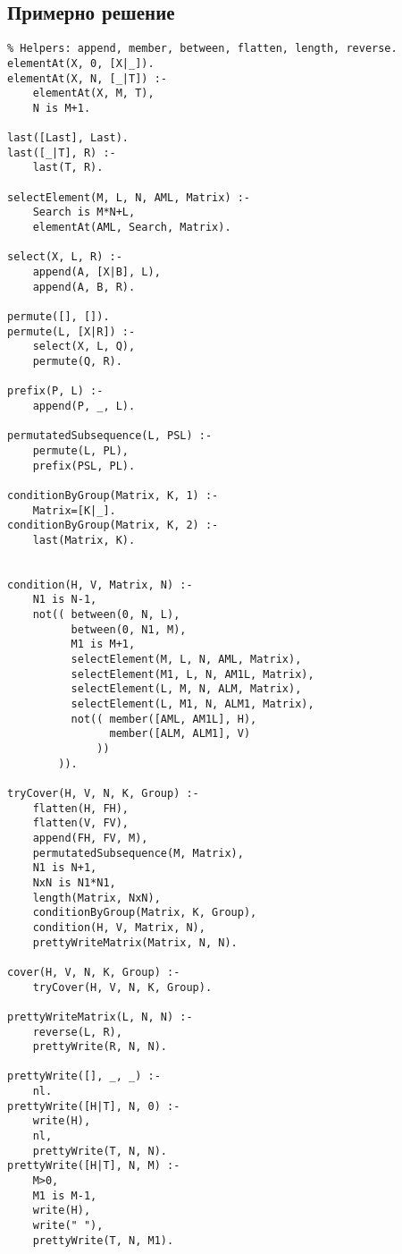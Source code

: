 \documentclass[12pt]{article}
\newenvironment{longlisting}{\captionsetup{type=listing}}{}
\begin{document}
\subsection{Примерно решение}
\begin{longlisting}
\begin{verbatim}
% Helpers: append, member, between, flatten, length, reverse.
elementAt(X, 0, [X|_]).
elementAt(X, N, [_|T]) :-
    elementAt(X, M, T),
    N is M+1.

last([Last], Last).
last([_|T], R) :-
    last(T, R).

selectElement(M, L, N, AML, Matrix) :-
    Search is M*N+L,
    elementAt(AML, Search, Matrix).

select(X, L, R) :-
    append(A, [X|B], L),
    append(A, B, R).

permute([], []).
permute(L, [X|R]) :-
    select(X, L, Q),
    permute(Q, R).

prefix(P, L) :-
    append(P, _, L).

permutatedSubsequence(L, PSL) :-
    permute(L, PL),
    prefix(PSL, PL).

conditionByGroup(Matrix, K, 1) :-
    Matrix=[K|_].
conditionByGroup(Matrix, K, 2) :-
    last(Matrix, K).


condition(H, V, Matrix, N) :-
    N1 is N-1,
    not(( between(0, N, L),
          between(0, N1, M),
          M1 is M+1,
          selectElement(M, L, N, AML, Matrix),
          selectElement(M1, L, N, AM1L, Matrix),
          selectElement(L, M, N, ALM, Matrix),
          selectElement(L, M1, N, ALM1, Matrix),
          not(( member([AML, AM1L], H),
                member([ALM, ALM1], V)
              ))
        )).

tryCover(H, V, N, K, Group) :-
    flatten(H, FH),
    flatten(V, FV),
    append(FH, FV, M),
    permutatedSubsequence(M, Matrix),
    N1 is N+1,
    NxN is N1*N1,
    length(Matrix, NxN),
    conditionByGroup(Matrix, K, Group),
    condition(H, V, Matrix, N),
    prettyWriteMatrix(Matrix, N, N).

cover(H, V, N, K, Group) :-
    tryCover(H, V, N, K, Group).

prettyWriteMatrix(L, N, N) :-
    reverse(L, R),
    prettyWrite(R, N, N).

prettyWrite([], _, _) :-
    nl.
prettyWrite([H|T], N, 0) :-
    write(H),
    nl,
    prettyWrite(T, N, N).
prettyWrite([H|T], N, M) :-
    M>0,
    M1 is M-1,
    write(H),
    write(" "),
    prettyWrite(T, N, M1).
\end{verbatim}
\end{longlisting}
\end{document}
